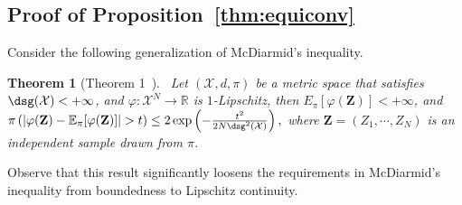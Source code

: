 \documentclass[11pt,leqno]{amsart}
\newtheorem{theorem}{Theorem}
\begin{document}
\subsection{Proof of Proposition~\ref{thm:equiconv}}
 Consider the following generalization of McDiarmid's inequality.
\begin{theorem}[Theorem 1~\citep{kontorovich2014}]~\label{thm:kont}
Let $(\mathcal{X},d,\pi)$ be a metric space that satisfies $\dsg(\mathcal{X}) <+\infty$, and $\varphi : \mathcal{X}^N \to \mathbb R$ is $1$-Lipschitz, then $E_\pi[\varphi(\mathbf Z)] < +\infty$, and
\(
    \mathbb \pi\left( |\varphi(\mathbf Z) - \mathbb E_\pi[\varphi(\mathbf Z)]| > t \right) \leq 2 \exp\left( -\frac{t^2}{2N \dsg^2(\mathcal X)} \right),
\)
where $\mathbf Z = (Z_1,\cdots,Z_N)$ is an independent sample drawn from $\pi$.
\end{theorem}

Observe that this result significantly loosens the requirements in McDiarmid's inequality from boundedness to Lipschitz continuity. 
\end{document}

